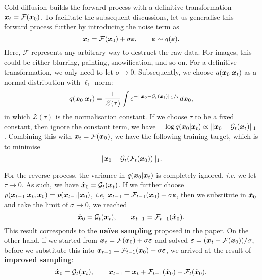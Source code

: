 Cold diffusion builds the forward process with a definitive transformation $\bm{x}_t=\mathcal{F}(\bm{x}_0)$. To facilitate the subsequent discussions, let us generalise this forward process further by introducing the noise term as 
\begin{equation}
    \label{eq:11.12}
    \bm{x}_t=\mathcal{F}(\bm{x}_0)+\sigma\bm{\varepsilon},\qquad \bm{\varepsilon}\sim q(\bm{\varepsilon}).
\end{equation}
Here, $\mathcal{F}$ represents any arbitrary way to destruct the raw data. For images, this could be either blurring, painting, snowification, and so on. For a definitive transformation, we only need to let $\sigma\to0$. Subsequently, we choose $q(\bm{x}_0|\bm{x}_{t})$ as a normal distribution with $\ell_1$-norm:
\begin{equation}
    \label{eq:11.13}
    q(\bm{x}_0|\bm{x}_{t})=\frac{1}{\mathcal{Z}(\tau)}\int e^{-\|\bm{x}_0-\mathcal{G}_t(\bm{x}_{t})\|_1/\tau} d\bm{x}_0,
\end{equation}
in which $\mathcal{Z}(\tau)$ is the normalisation constant. If we choose $\tau$ to be a fixed constant, then ignore the constant term, we have $-\log q(\bm{x}_0|\bm{x}_{t})\propto \|\bm{x}_0-\mathcal{G}_t(\bm{x}_{t}) \|_1$. Combining this with $\bm{x}_{t}=\mathcal{F}(\bm{x}_0)$, we have the following training target, which is to minimise
\begin{equation}
    \label{eq:11.14}
    \|\bm{x}_0-\mathcal{G}_t(\mathcal{F}_t(\bm{x}_0))\|_1.
\end{equation}

For the reverse process, the variance in $q(\bm{x}_0|\bm{x}_{t})$ is completely ignored, \emph{i.e.} we let $\tau\to0$. As such, we have $\hat{\bm{x}}_0=\mathcal{G}_t(\bm{x}_{t})$. If we further choose $p(\bm{x}_{t-1}|\bm{x}_{t},\bm{x}_0)=p(\bm{x}_{t-1}|\bm{x}_0)$, \emph{i.e}, $\bm{x}_{t-1}=\mathcal{F}_{t-1}(\bm{x}_0)+\sigma\bm{\varepsilon}$, then we substitute in $\hat{\bm{x}}_0$ and take the limit of $\sigma\to 0$, we reached
\begin{equation}
    \label{eq:11.15}
    \hat{\bm{x}}_0=\mathcal{G}_t (\bm{x}_{t}),\qquad \bm{x}_{t-1}=\mathcal{F}_{t-1}(\hat{\bm{x}}_0).
\end{equation}
This result corresponds to the \textbf{na\"{i}ve sampling} proposed in the paper. On the other hand, if we started from $\bm{x}_t=\mathcal{F}(\bm{x}_0)+\sigma\bm{\varepsilon}$ and solved $\bm{\varepsilon}=(\bm{x}_t-\mathcal{F}(\bm{x}_0))/\sigma$, before we substitute this into $\bm{x}_{t-1}=\mathcal{F}_{t-1}(\bm{x}_0)+\sigma\bm{\varepsilon}$, we arrived at the result of \textbf{improved sampling}:
\begin{equation}
    \label{eq:11.16}
    \hat{\bm{x}}_0=\mathcal{G}_t (\bm{x}_{t}),\qquad \bm{x}_{t-1}=\bm{x}_{t}+\mathcal{F}_{t-1}(\hat{\bm{x}}_0)-\mathcal{F}_t(\hat{\bm{x}}_0).
\end{equation}

